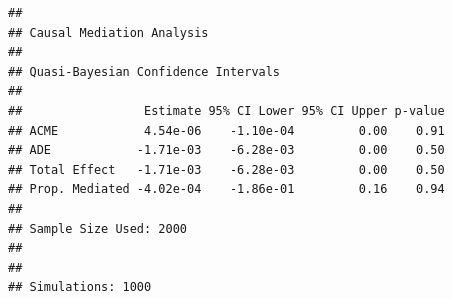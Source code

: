 \documentclass[
      12pt,
        ]{article}
\begin{document}
\begin{verbatim}
## 
## Causal Mediation Analysis 
## 
## Quasi-Bayesian Confidence Intervals
## 
##                 Estimate 95% CI Lower 95% CI Upper p-value
## ACME            4.54e-06    -1.10e-04         0.00    0.91
## ADE            -1.71e-03    -6.28e-03         0.00    0.50
## Total Effect   -1.71e-03    -6.28e-03         0.00    0.50
## Prop. Mediated -4.02e-04    -1.86e-01         0.16    0.94
## 
## Sample Size Used: 2000 
## 
## 
## Simulations: 1000
\end{verbatim}
\newpage
\singlespacing 
           
  
\end{document}
